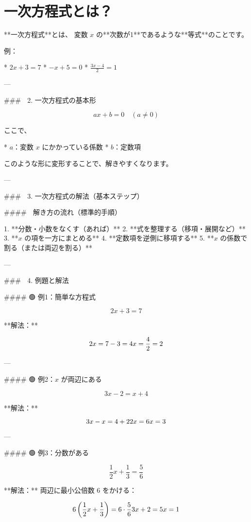 \documentclass{jsarticle}
\begin{document}

\section*{一次方程式とは？}

**一次方程式**とは、
変数 $x$ の**次数が1**であるような**等式**のことです。

例：

* $2x + 3 = 7$
* $-x + 5 = 0$
* $\frac{3x - 4}{2} = 1$

---

### 🔷 2. 一次方程式の基本形

$$
ax + b = 0 \quad (a \ne 0)
$$

ここで、

* $a$：変数 $x$ にかかっている係数
* $b$：定数項

このような形に変形することで、解きやすくなります。

---

### 🔷 3. 一次方程式の解法（基本ステップ）

#### 🧭 解き方の流れ（標準的手順）

1. **分数・小数をなくす（あれば）**
2. **式を整理する（移項・展開など）**
3. **$x$ の項を一方にまとめる**
4. **定数項を逆側に移項する**
5. **$x$ の係数で割る（または両辺を割る）**

---

### 🔷 4. 例題と解法

#### 🟢 例1：簡単な方程式

$$
2x + 3 = 7
$$

**解法：**

$$
2x = 7 - 3 = 4 \\
x = \frac{4}{2} = 2
$$

---

#### 🟢 例2：$x$ が両辺にある

$$
3x - 2 = x + 4
$$

**解法：**

$$
3x - x = 4 + 2 \\
2x = 6 \\
x = 3
$$

---

#### 🟢 例3：分数がある

$$
\frac{1}{2}x + \frac{1}{3} = \frac{5}{6}
$$

**解法：**
両辺に最小公倍数 $6$ をかける：

$$
6 \left(\frac{1}{2}x + \frac{1}{3} \right) = 6 \cdot \frac{5}{6} \\
3x + 2 = 5 \\
x = 1
$$
\end{document}

